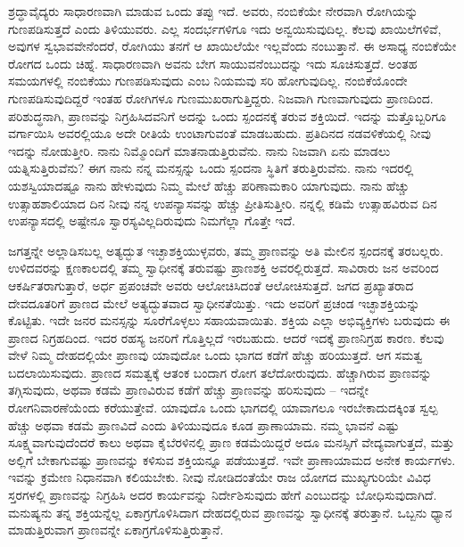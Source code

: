 ಶ್ರದ್ಧಾವೈದ್ಯರು ಸಾಧಾರಣವಾಗಿ ಮಾಡುವ ಒಂದು ತಪ್ಪು ಇದೆ. ಅವರು, ನಂಬಿಕೆಯೇ ನೇರವಾಗಿ ರೋಗಿಯನ್ನು ಗುಣಪಡಿಸುತ್ತದೆ ಎಂದು ತಿಳಿಯುವರು. ಎಲ್ಲ ಸಂದರ್ಭಗಳಿಗೂ ಇದು ಅನ್ವಯಿಸುವುದಿಲ್ಲ. ಕೆಲವು ಖಾಯಿಲೆಗಳಿವೆ, ಅವುಗಳ ಸ್ವಭಾವವೇನೆಂದರೆ, ರೋಗಿಯು ತನಗೆ ಆ ಖಾಯಿಲೆಯೇ ಇಲ್ಲವೆಂದು ನಂಬುತ್ತಾನೆ. ಈ ಅಸಾಧ್ಯ ನಂಬಿಕೆಯೇ ರೋಗದ ಒಂದು ಚಿಹ್ನೆ. ಸಾಧಾರಣವಾಗಿ ಅವನು ಬೇಗ ಸಾಯುವನೆಂಬುದನ್ನು ಇದು ಸೂಚಿಸುತ್ತದೆ. ಅಂತಹ ಸಮಯಗಳಲ್ಲಿ ನಂಬಿಕೆಯು ಗುಣಪಡಿಸುವುದು ಎಂಬ ನಿಯಮವು ಸರಿ ಹೋಗುವುದಿಲ್ಲ. ನಂಬಿಕೆಯೊಂದೇ ಗುಣಪಡಿಸುವುದಿದ್ದರೆ ಇಂತಹ ರೋಗಿಗಳೂ ಗುಣಮುಖರಾಗುತ್ತಿದ್ದರು. ನಿಜವಾಗಿ ಗುಣವಾಗುವುದು ಪ್ರಾಣದಿಂದ. ಪರಿಶುದ್ಧನಾಗಿ, ಪ್ರಾಣವನ್ನು ನಿಗ್ರಹಿಸಿದವನಿಗೆ ಅದನ್ನು ಒಂದು ಸ್ಪಂದನಕ್ಕೆ ತರುವ ಶಕ್ತಿಯಿದೆ. ಇದನ್ನು ಮತ್ತೊಬ್ಬರಿಗೂ ವರ್ಗಾಯಿಸಿ ಅವರಲ್ಲಿಯೂ ಅದೇ ರೀತಿಯೆ ಉಂಟಾಗುವಂತೆ ಮಾಡಬಹುದು. ಪ್ರತಿದಿನದ ನಡವಳಿಕೆಯಲ್ಲಿ ನೀವು ಇದನ್ನು ನೋಡುತ್ತೀರಿ. ನಾನು ನಿಮ್ಮೊಂದಿಗೆ ಮಾತನಾಡುತ್ತಿರುವೆನು. ನಾನು ನಿಜವಾಗಿ ಏನು ಮಾಡಲು ಯತ್ನಿಸುತ್ತಿರುವೆನು? ಈಗ ನಾನು ನನ್ನ ಮನಸ್ಸನ್ನು ಒಂದು ಸ್ಪಂದನಾ ಸ್ಥಿತಿಗೆ ತರುತ್ತಿರುವೆನು. ನಾನು ಇದರಲ್ಲಿ ಯಶಸ್ವಿಯಾದಷ್ಟೂ ನಾನು ಹೇಳುವುದು ನಿಮ್ಮ ಮೇಲೆ ಹೆಚ್ಚು ಪರಿಣಾಮಕಾರಿ ಯಾಗುವುದು. ನಾನು ಹೆಚ್ಚು ಉತ್ಸಾಹಶಾಲಿಯಾದ ದಿನ ನೀವು ನನ್ನ ಉಪನ್ಯಾಸವನ್ನು ಹೆಚ್ಚು ಪ್ರೀತಿಸುತ್ತೀರಿ. ನನ್ನಲ್ಲಿ ಕಡಿಮೆ ಉತ್ಸಾಹವಿರುವ ದಿನ ಉಪನ್ಯಾಸದಲ್ಲಿ ಅಷ್ಟೇನೂ ಸ್ವಾರಸ್ಯವಿಲ್ಲದಿರುವುದು ನಿಮಗೆಲ್ಲಾ ಗೊತ್ತೇ ಇದೆ. 


\eject

ಜಗತ್ತನ್ನೇ ಅಲ್ಲಾಡಿಸಬಲ್ಲ ಅತ್ಯದ್ಭುತ ಇಚ್ಛಾಶಕ್ತಿಯುಳ್ಳವರು, ತಮ್ಮ ಪ್ರಾಣವನ್ನು ಅತಿ ಮೇಲಿನ ಸ್ಪಂದನಕ್ಕೆ ತರಬಲ್ಲರು. ಉಳಿದವರನ್ನು ಕ್ಷಣಕಾಲದಲ್ಲಿ ತಮ್ಮ ಸ್ವಾಧೀನಕ್ಕೆ ತರುವಷ್ಟು ಪ್ರಾಣಶಕ್ತಿ ಅವರಲ್ಲಿರುತ್ತದೆ. ಸಾವಿರಾರು ಜನ ಅವರಿಂದ ಆಕರ್ಷಿತರಾಗುತ್ತಾರೆ, ಅರ್ಧ ಪ್ರಪಂಚವೇ ಅವರು ಆಲೋಚಿಸಿದಂತೆ ಆಲೋಚಿಸುತ್ತದೆ. ಜಗದ ಪ್ರಖ್ಯಾತರಾದ ದೇವದೂತರಿಗೆ ಪ್ರಾಣದ ಮೇಲೆ ಅತ್ಯದ್ಭುತವಾದ ಸ್ವಾಧೀನತೆಯಿತ್ತು. ಇದು ಅವರಿಗೆ ಪ್ರಚಂಡ ಇಚ್ಛಾಶಕ್ತಿಯನ್ನು ಕೊಟ್ಟಿತು. ಇದೇ ಜನರ ಮನಸ್ಸನ್ನು ಸೂರೆಗೊಳ್ಳಲು ಸಹಾಯವಾಯಿತು. ಶಕ್ತಿಯ ಎಲ್ಲಾ ಅಭಿವ್ಯಕ್ತಿಗಳು ಬರುವುದು ಈ ಪ್ರಾಣದ ನಿಗ್ರಹದಿಂದ. ಇದರ ರಹಸ್ಯ ಜನರಿಗೆ ಗೊತ್ತಿಲ್ಲದೆ ಇರಬಹುದು. ಆದರೆ ಇದಕ್ಕೆ ಪ್ರಾಣನಿಗ್ರಹ ಕಾರಣ. ಕೆಲವು ವೇಳೆ ನಿಮ್ಮ ದೇಹದಲ್ಲಿಯೇ ಪ್ರಾಣವು ಯಾವುದೋ ಒಂದು ಭಾಗದ ಕಡೆಗೆ ಹೆಚ್ಚು ಹರಿಯುತ್ತದೆ. ಆಗ ಸಮತ್ವ ಬದಲಾಯಿಸುವುದು. ಪ್ರಾಣದ ಸಮತ್ವಕ್ಕೆ ಆತಂಕ ಬಂದಾಗ ರೋಗ ತಲೆದೋರುವುದು. ಹೆಚ್ಚಾಗಿರುವ ಪ್ರಾಣವನ್ನು ತಗ್ಗಿಸುವುದು, ಅಥವಾ ಕಡಮೆ ಪ್ರಾಣವಿರುವ ಕಡೆಗೆ ಹೆಚ್ಚು ಪ್ರಾಣವನ್ನು ಹರಿಸುವುದು – ಇದನ್ನೇ ರೋಗನಿವಾರಣೆಯೆಂದು ಕರೆಯುತ್ತೇವೆ. ಯಾವುದೊ ಒಂದು ಭಾಗದಲ್ಲಿ ಯಾವಾಗಲೂ ಇರಬೇಕಾದುದಕ್ಕಿಂತ ಸ್ವಲ್ಪ ಹೆಚ್ಚು ಅಥವಾ ಕಡಮೆ ಪ್ರಾಣವಿದೆ ಎಂದು ತಿಳಿಯುವುದೂ ಕೂಡ ಪ್ರಾಣಾಯಾಮ. ನಮ್ಮ ಭಾವನೆ ಎಷ್ಟು ಸೂಕ್ಷ್ಮವಾಗುವುದೆಂದರೆ ಕಾಲು ಅಥವಾ ಕೈಬೆರಳಿನಲ್ಲಿ ಪ್ರಾಣ ಕಡಮೆಯಿದ್ದರೆ ಅದೂ ಮನಸ್ಸಿಗೆ ವೇದ್ಯವಾಗುತ್ತದೆ, ಮತ್ತು ಅಲ್ಲಿಗೆ ಬೇಕಾಗುವಷ್ಟು ಪ್ರಾಣವನ್ನು ಕಳಿಸುವ ಶಕ್ತಿಯನ್ನೂ ಪಡೆಯುತ್ತದೆ. ಇವೇ ಪ್ರಾಣಾಯಾಮದ ಅನೇಕ ಕಾರ್ಯಗಳು. ಇವನ್ನು ಕ್ರಮೇಣ ನಿಧಾನವಾಗಿ ಕಲಿಯಬೇಕು. ನೀವು ನೋಡಿದಂತೆಯೇ ರಾಜ ಯೋಗದ ಮುಖ್ಯಗುರಿಯೇ ವಿವಿಧ ಸ್ತರಗಳಲ್ಲಿ ಪ್ರಾಣವನ್ನು ನಿಗ್ರಹಿಸಿ ಅದರ ಕಾರ್ಯವನ್ನು ನಿರ್ದೇಶಿಸುವುದು ಹೇಗೆ ಎಂಬುದನ್ನು ಬೋಧಿಸುವುದಾಗಿದೆ. ಮನುಷ್ಯನು ತನ್ನ ಶಕ್ತಿಯನ್ನೆಲ್ಲ ಏಕಾಗ್ರಗೊಳಿಸಿದಾಗ ದೇಹದಲ್ಲಿರುವ ಪ್ರಾಣವನ್ನು ಸ್ವಾಧೀನಕ್ಕೆ ತರುತ್ತಾನೆ. ಒಬ್ಬನು ಧ್ಯಾನ ಮಾಡುತ್ತಿರುವಾಗ ಪ್ರಾಣವನ್ನೇ ಏಕಾಗ್ರಗೊಳಿಸುತ್ತಿರುತ್ತಾನೆ. 

